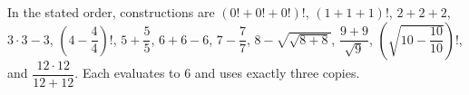 In the stated order, constructions are $(0!+0!+0!)!$, $(1+1+1)!$, $2+2+2$, $3\cdot3-3$, $(4-\dfrac{4}{4})!$, $5+\dfrac{5}{5}$, $6+6-6$, $7-\dfrac{7}{7}$, $8-\sqrt{\sqrt{8+8}}$, $\dfrac{9+9}{\sqrt9}$, $(\sqrt{10-\dfrac{10}{10}})!$, and $\dfrac{12\cdot12}{12+12}$. Each evaluates to 6 and uses exactly three copies.
